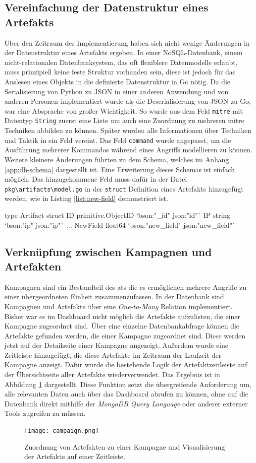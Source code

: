 \subsection{Vereinfachung der Datenstruktur eines Artefakts}
Über den Zeitraum der Implementierung haben sich nicht wenige Änderungen in der Datenstruktur eines Artefakts ergeben. In einer NoSQL-Datenbank, einem nicht-relationalen Datenbanksystem, das oft flexiblere Datenmodelle erlaubt, muss prinzipiell keine feste Struktur vorhanden sein, diese ist jedoch für das Auslesen eines Objekts in die definierte Datenstruktur in Go nötig. Da die Serialisierung von Python zu JSON in einer anderen Anwendung und von anderen Personen implementiert wurde als die Deserialisierung von JSON zu Go, war eine Absprache von großer Wichtigkeit. So wurde aus dem Feld \verb|mitre| mit Datentyp \verb|String| zuerst eine Liste um auch eine Zuordnung zu mehreren \gls{mitre} Techniken abbilden zu können. Später wurden alle Informationen über Techniken und Taktik in ein Feld vereint. Das Feld \verb|command| wurde angepasst, um die Ausführung mehrerer Kommandos während eines Angriffs modellieren zu können. Weitere kleinere Änderungen führten zu dem Schema, welches im Anhang \ref{app:db-schema} dargestellt ist. Eine Erweiterung dieses Schemas ist einfach möglich. Das hinzugekommene Feld muss dafür in der Datei \verb|pkg\artifacts\model.go| in der \verb|struct| Definition eines Artefakts hinzugefügt werden, wie in Listing \ref{list:new-field} demonstriert ist.
\begin{code}[caption=Hinzufügen eines Feldes zum Schema in Go, label={list:new-field}]
    type Artifact struct {
            ID          primitive.ObjectID  `bson:"_id" json:"id"`
            IP          string              `bson:"ip" json:"ip"`
            ...
            NewField    float64             `bson:"new_field" json:"new_field"`
        }
\end{code}

\subsection{Verknüpfung zwischen Kampagnen und Artefakten}
Kampagnen sind ein Bestandteil des \gls{at}s die es ermöglichen mehrere Angriffe zu einer übergeordneten Einheit zusammenzufassen. In der Datenbank sind Kampagnen und Artefakte über eine \textit{One-to-Many} Relation implementiert. Bisher war es im Dashboard nicht möglich die Artefakte aufzulisten, die einer Kampagne zugeordnet sind. Über eine einzelne Datenbankabfrage können die Artefakte gefunden werden, die einer Kampagne zugeordnet sind. Diese werden jetzt auf der Detailseite einer Kampagne angezeigt. Außerdem wurde eine Zeitleiste hinzugefügt, die diese Artefakte im Zeitraum der Laufzeit der Kampagne anzeigt. Dafür wurde die bestehende Logik der Artefaktzeitleiste auf der Übersichtseite aller Artefakte wiederverwendet. Das Ergebnis ist in Abbildung \ref{fig:campaign} dargestellt. Diese Funktion setzt die übergreifende Anforderung um, alle relevanten Daten auch über das Dashboard abrufen zu können, ohne auf die Datenbank direkt mithilfe der \textit{MongoDB Query Language} oder anderer externer Tools zugreifen zu müssen.

\begin{figure}
    \centering
    \texttt{[image: campaign.png]}
    \caption{Zuordnung von Artefakten zu einer Kampagne und Visualisierung der Artefakte auf einer Zeitleiste.}
    \label{fig:campaign}
\end{figure}